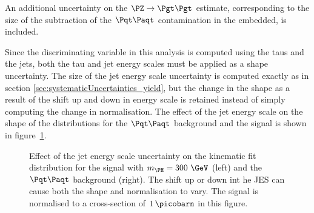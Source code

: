 An additional uncertainty on the $\ZToTauTau$ estimate, corresponding to the
size of the subtraction of the $\ttbar$ contamination in the embedded, is
included. 

Since the discriminating variable in this analysis is computed using the taus
and the jets, both the tau and jet energy scales must be applied as a shape
uncertainty. The size of the jet energy scale uncertainty is computed exactly as
in section \ref{sec:systematicUncertainties_yield}, but the change in the shape
as a result of the shift up and down in energy scale is retained instead of
simply computing the change in normalisation. The effect of the jet energy scale
on the shape of the distributions for the $\ttbar$ background and the signal is
shown in figure~\ref{fig:kinfitjes}.

\begin{figure}
\begin{center}

\end{center}
\caption[Effect of the jet energy scale uncertainty on the kinematic fit distribution for
the signal with $m_{\PH}=300~\GeV$ (left) and the $\ttbar$ background (right).]{
Effect of the jet energy scale uncertainty on the kinematic fit distribution for
the signal with $m_{\PH}=300~\GeV$ (left) and the $\ttbar$ background (right).
The shift up or down int he JES can cause both the shape and normalisation to
vary. The signal is normalised to a cross-section of $1\,\picobarn$ in this figure.}
\label{fig:kinfitjes}
\end{figure} 

